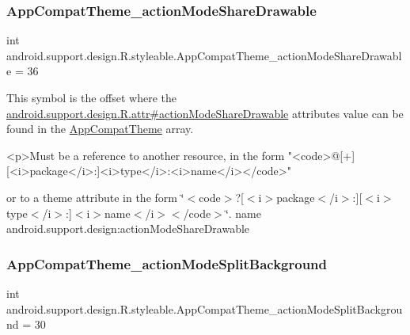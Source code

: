 \subsubsection{\texorpdfstring{App\+Compat\+Theme\+\_\+action\+Mode\+Share\+Drawable}{AppCompatTheme\_actionModeShareDrawable}}
{\footnotesize\ttfamily int android.\+support.\+design.\+R.\+styleable.\+App\+Compat\+Theme\+\_\+action\+Mode\+Share\+Drawable = 36\hspace{0.3cm}{\ttfamily [static]}}

This symbol is the offset where the \hyperlink{classandroid_1_1support_1_1design_1_1R_1_1attr_ad6838a7f1f0cfe43673bb4251abc61c6}{android.\+support.\+design.\+R.\+attr\#action\+Mode\+Share\+Drawable} attribute\textquotesingle{}s value can be found in the \hyperlink{classandroid_1_1support_1_1design_1_1R_1_1styleable_afb351dc8de20cbd4c89abe360373010c}{App\+Compat\+Theme} array.

\begin{DoxyVerb}      <p>Must be a reference to another resource, in the form "<code>@[+][<i>package</i>:]<i>type</i>:<i>name</i></code>"
\end{DoxyVerb}
 or to a theme attribute in the form \char`\"{}$<$code$>$?\mbox{[}$<$i$>$package$<$/i$>$\+:\mbox{]}\mbox{[}$<$i$>$type$<$/i$>$\+:\mbox{]}$<$i$>$name$<$/i$>$$<$/code$>$\char`\"{}.  name android.\+support.\+design\+:action\+Mode\+Share\+Drawable \mbox{\label{classandroid_1_1support_1_1design_1_1R_1_1styleable_a4b4b91c68eff93edcf95cbb4b498cfeb}} 
\subsubsection{\texorpdfstring{App\+Compat\+Theme\+\_\+action\+Mode\+Split\+Background}{AppCompatTheme\_actionModeSplitBackground}}
{\footnotesize\ttfamily int android.\+support.\+design.\+R.\+styleable.\+App\+Compat\+Theme\+\_\+action\+Mode\+Split\+Background = 30\hspace{0.3cm}{\ttfamily [static]}}

